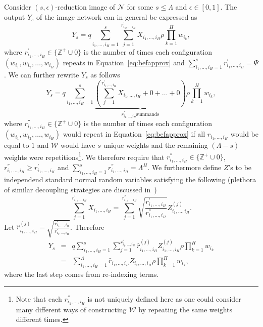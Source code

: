 \documentclass[twoside]{article}
\begin{document}
Consider $(s,\epsilon)$-reduction image of $\mathcal{N}$ for some $s \leq \Lambda$ and $\epsilon \in [0,1]$. The output $Y_s$ of the image network can in general be expressed as
\[Y_s = q\!\!\!\sum_{i_1,\dots,i_H=1}^{s}\!\!\!\sum_{j=1}^{r_{i_1,\dots,i_H}^{'}}X_{i_1,\dots,i_H}\rho\prod_{k = 1}^{H}\!\!w_{i_k},
\]
where $r_{i_1,\dots,i_H}^{'} \in \{\mathbb{Z}^{+}\cup{0}\}$ is the number of times each configuration $(w_{i_1},w_{i_2},\dots,w_{i_H})$ repeats in Equation~\ref{eq:befapprox} and $\sum_{i_1,\dots,i_H=1}^{s}r_{i_1,\dots,i_H}^{'} = \Psi$. We can further rewrite $Y_s$ as follows
\[Y_s = q\!\!\!\sum_{i_1,\dots,i_H=1}^{s}\!\!\underbrace{\left(\!\sum_{j=1}^{r_{i_1,\dots,i_H}^{'}}\!\!\!X_{i_1,\dots,i_H} + 0 + \dots + 0\right)}_{r_{i_1,\dots,i_H}^{''} \text{summands}}\!\!\rho\prod_{k = 1}^{H}\!\!w_{i_k},
\]
where $r_{i_1,\dots,i_H}^{''} \in \{\mathbb{Z}^{+}\cup{0}\}$ is the number of times each configuration $(w_{i_1},w_{i_2},\dots,w_{i_H})$ would repeat in Equation~\ref{eq:befapprox} if all $r_{i_1,\dots,i_H}$ would be equal to $1$ and $\mathcal{W}$ would have $s$ unique weights and the remaining $(\Lambda - s)$ weights were repetitions\footnote{Note that each $r_{i_1,\dots,i_H}^{''}$ is not uniquely defined here as one could consider many different ways of constructing $\mathcal{W}$ by repeating the same weights different times.}. We therefore require that $r_{i_1,\dots,i_H}^{''} \in \{\mathbb{Z}^{+}\cup{0}\}$, $r_{i_1,\dots,i_H}^{''} \geq r_{i_1,\dots,i_H}^{'}$ and $\sum_{i_1,\dots,i_H=1}^{s}r_{i_1,\dots,i_H}^{''} = \Lambda^H$. We furthermore define $Z$'s to be independend standard normal random variables satisfying the following (plethora of similar decoupling strategies are discussed in~\cite{opac-b1095246})
\[\sum_{j=1}^{r_{i_1,\dots,i_H}^{'}}X_{i_1,\dots,i_H} = \sum_{j=1}^{r_{i_1,\dots,i_H}^{''}} \sqrt{\frac{r_{i_1,\dots,i_H}^{'}}{r_{i_1,\dots,i_H}^{''}}}Z_{i_1,\dots,i_H}^{(j)}. 
\]
Let $\hat{r}_{i_1,\dots,i_H}^{(j)} = \sqrt{\frac{r_{i_1,\dots,i_H}^{'}}{r_{i_1,\dots,i_H}^{''}}}$. Therefore
\begin{eqnarray*}
Y_s &=& q\sum_{i_1,\dots,i_H=1}^{s}\sum_{j=1}^{r_{i_1,\dots,i_H}^{''}}\hat{r}_{i_1,\dots,i_H}^{(j)}Z_{i_1,\dots,i_H}^{(j)}\rho\prod_{k = 1}^{H}w_{i_k}\\
&=& \sum_{i_1,\dots,i_H=1}^{\Lambda}\hat{r}_{i_1,\dots,i_H}Z_{i_1,\dots,i_H}\rho\prod_{k = 1}^{H}w_{i_k},
\end{eqnarray*}
where the last step comes from re-indexing terms. 
\end{document}
